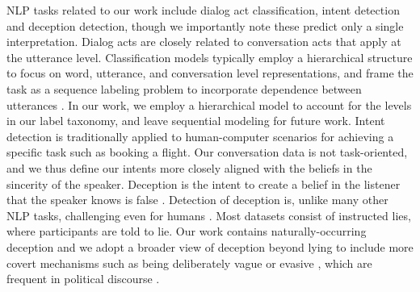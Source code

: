 NLP tasks related to our work include dialog act classification, intent detection and deception detection, though we importantly note these predict only a single interpretation. Dialog acts are closely related to conversation acts that apply at the utterance level. Classification models typically employ a hierarchical structure to focus on word, utterance, and conversation level representations, and frame the task as a sequence labeling problem to incorporate dependence between utterances \cite{Chen:2018}. In our work, we employ a hierarchical model to account for the levels in our label taxonomy, and leave sequential modeling for future work. Intent detection is traditionally applied to human-computer scenarios for achieving a specific task such as booking a flight. 
Our conversation data is not task-oriented, and we thus define our intents more closely aligned with the beliefs in the sincerity of the speaker. Deception is the intent to create a belief in the listener that the speaker knows is false \cite{Girlea:2017}. Detection of deception is, unlike many other NLP tasks, challenging even for humans \cite{Ott:2011}.
Most datasets consist of instructed lies, where participants are told to lie. 
Our work contains naturally-occurring deception and we adopt a broader view of deception beyond lying to include more covert mechanisms such as being deliberately vague or evasive \cite{Clementson:2018}, which are frequent in political discourse \cite{Bull:2008}.

%
 
